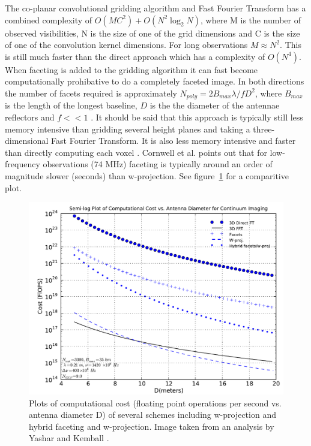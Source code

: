 \documentclass[a4paper, two column]{article}
\begin{document}
 The co-planar convolutional gridding algorithm and Fast Fourier Transform has a combined complexity of $O(MC^2) + O(N^2\log_2{N})$, where M is the number of observed visibilities, N is the size of one of the grid dimensions and C is the size of one of the convolution kernel 
 dimensions. For long observations $M\approx N^2$. This is still much faster than the direct approach which has a complexity of $O(N^4)$. When faceting is added to the gridding algorithm it can fast become computationally prohibative to do a completely faceted image. In both directions 
 the number of facets required is approximately $N_{poly}=2B_{max}\lambda/fD^2$, where $B_{max}$ is the length of the longest baseline, $D$ is the the diameter of the antennae reflectors and $f << 1$ \cite{taylor1999synthesis}. It should be said that this approach is typically
 still less memory intensive than gridding several height planes and taking a three-dimensional Fast Fourier Transform. It is also less memory intensive and faster than directly computing each voxel \cite{yashar2009tdp}. Cornwell et al. \cite{1416440} points out that for low-frequency observations (74 MHz) 
 faceting is typically around an order of magnitude slower (seconds) than w-projection.  See figure~\ref{IMG_PERFORMANCE_COMPARISON} for a comparitive plot.
 \begin{figure}
 \begin{mdframed}
  \includegraphics[width=1.0\textwidth]{performance_faceting.png}
  \caption{Plots of computational cost (floating point operations per second vs. antenna diameter D) of several schemes including w-projection and hybrid faceting and w-projection. Image taken from an analysis by Yashar and Kemball \cite{yashar2009tdp}.}
  \label{IMG_PERFORMANCE_COMPARISON}
 \end{mdframed}
 \end{figure}
\end{document}
